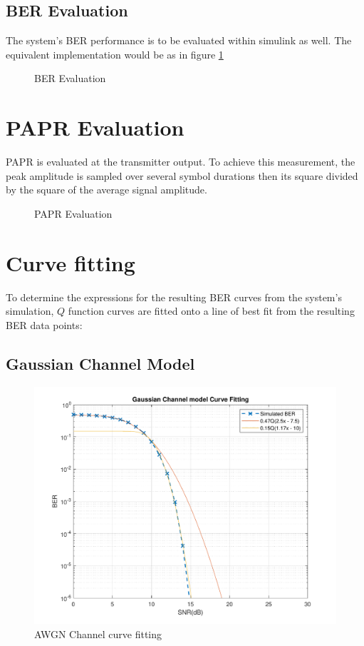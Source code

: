\subsection{BER Evaluation}
The system's \gls{BER} performance is to be evaluated within \gls{simulink} as well. The equivalent implementation would be as in figure \ref{fig:ber_blk_meth}
\begin{figure}[htpb!]
	\centerline{\resizebox{15cm}{!}{}}
	\caption{\gls{BER} Evaluation}
	\label{fig:ber_blk_meth}
\end{figure}

\section{PAPR Evaluation}
\gls{PAPR} is evaluated at the transmitter output. To achieve this measurement, the peak amplitude is sampled over several symbol durations then its square divided by the square of the average signal amplitude.
\begin{figure}[!h]
	\centerline{\resizebox{10cm}{!}{}}
	\caption{\gls{PAPR} Evaluation}
	\label{fig:papr_blk_meth}
\end{figure}
\pagebreak
\section{Curve fitting}

To determine the expressions for  the resulting BER curves from the system's simulation, \(Q\) function curves are fitted onto a line of best fit from the resulting BER data points:
\subsection{Gaussian Channel Model}

\begin{figure}[htpb!]
	\centering
	\includegraphics[scale=0.7]{Graphics/Methodology/GaussCurveFit.pdf}
	\caption{AWGN Channel curve fitting}
	\label{fig:gaussCurveFit}
\end{figure}
\pagebreak

